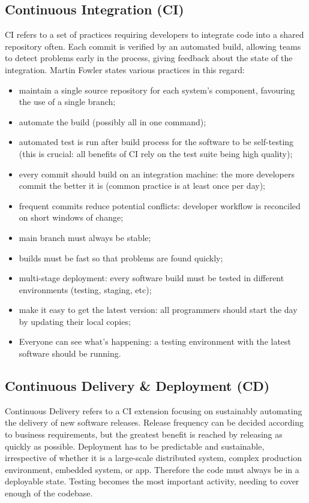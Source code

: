 \documentclass[a4paper,
	       keeplastbox,   %
	       References
	       ]{jacow}
\begin{document}
\subsection{Continuous Integration (CI)}
CI refers to a set of practices requiring developers to integrate code into a shared repository often. Each commit is verified by an automated build, allowing teams to detect problems early in the process, giving feedback about the state of the integration. Martin Fowler\cite{CI} states various practices in this regard:
\begin{itemize}
	\setlength\itemsep{0.1em}
    \item maintain a single source repository for each system's component, favouring the use of a single branch;
    \item automate the build (possibly all in one command);
    \item automated test is run after build process for the software to be self-testing (this is crucial: all benefits of CI rely on the test suite being high quality);
    \item every commit should build on an integration machine: the more developers commit the better it is (common practice is at least once per day);
    \item frequent commits reduce potential conflicts: developer workflow is reconciled on short windows of change;
    \item main branch must always be stable;
    \item builds must be fast so that problems are found quickly;
    \item multi-stage deployment: every software build must be tested in different environments (testing, staging, etc);
    \item make it easy to get the latest version: all programmers should start the day by updating their local copies;
    \item Everyone can see what’s happening: a testing environment with the latest software should be running.
\end{itemize}

\subsection{Continuous Delivery \& Deployment (CD)}
Continuous Delivery\cite{CD} refers to a CI extension focusing on sustainably automating the delivery of new software releases. Release frequency can be decided according to business requirements, but the greatest benefit is reached by releasing as quickly as possible. Deployment has to be predictable and sustainable, irrespective of whether it is a large-scale distributed system, complex production environment, embedded system, or app. Therefore the code must always be in a deployable state. Testing becomes the most important activity, needing to cover enough of the codebase.
\end{document}
